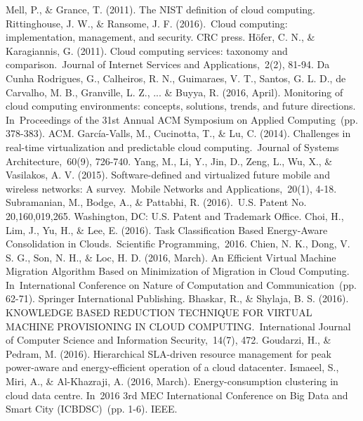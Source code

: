 
\begin{thebibliography}{99}

\begin{LTRbibitems}
\resetlatinfont
	Mell, P., \& Grance, T. (2011). The NIST definition of cloud computing.
	Rittinghouse, J. W., \& Ransome, J. F. (2016). Cloud computing: implementation, management, and security. CRC press.
	Höfer, C. N., \& Karagiannis, G. (2011). Cloud computing services: taxonomy and comparison. Journal of Internet Services and Applications, 2(2), 81-94.
	Da Cunha Rodrigues, G., Calheiros, R. N., Guimaraes, V. T., Santos, G. L. D., de Carvalho, M. B., Granville, L. Z., ... \& Buyya, R. (2016, April). Monitoring of cloud computing environments: concepts, solutions, trends, and future directions. In Proceedings of the 31st Annual ACM Symposium on Applied Computing (pp. 378-383). ACM.
	García-Valls, M., Cucinotta, T., \& Lu, C. (2014). Challenges in real-time virtualization and predictable cloud computing. Journal of Systems Architecture, 60(9), 726-740.
	Yang, M., Li, Y., Jin, D., Zeng, L., Wu, X., \& Vasilakos, A. V. (2015). Software-defined and virtualized future mobile and wireless networks: A survey. Mobile Networks and Applications, 20(1), 4-18.
	 Subramanian, M., Bodge, A., \& Pattabhi, R. (2016). U.S. Patent No. 20,160,019,265. Washington, DC: U.S. Patent and Trademark Office.
	 Choi, H., Lim, J., Yu, H., \& Lee, E. (2016). Task Classification Based Energy-Aware Consolidation in Clouds. Scientific Programming, 2016.
	 Chien, N. K., Dong, V. S. G., Son, N. H., \& Loc, H. D. (2016, March). An Efficient Virtual Machine Migration Algorithm Based on Minimization of Migration in Cloud Computing. In International Conference on Nature of Computation and Communication (pp. 62-71). Springer International Publishing.
	 Bhaskar, R., \& Shylaja, B. S. (2016). KNOWLEDGE BASED REDUCTION TECHNIQUE FOR VIRTUAL MACHINE PROVISIONING IN CLOUD COMPUTING. International Journal of Computer Science and Information Security, 14(7), 472.
	 Goudarzi, H., \& Pedram, M. (2016). Hierarchical SLA-driven resource management for peak power-aware and energy-efficient operation of a cloud datacenter.
	  Ismaeel, S., Miri, A., \& Al-Khazraji, A. (2016, March). Energy-consumption clustering in cloud data centre. In 2016 3rd MEC International Conference on Big Data and Smart City (ICBDSC) (pp. 1-6). IEEE.

\end{LTRbibitems}
\end{thebibliography}
